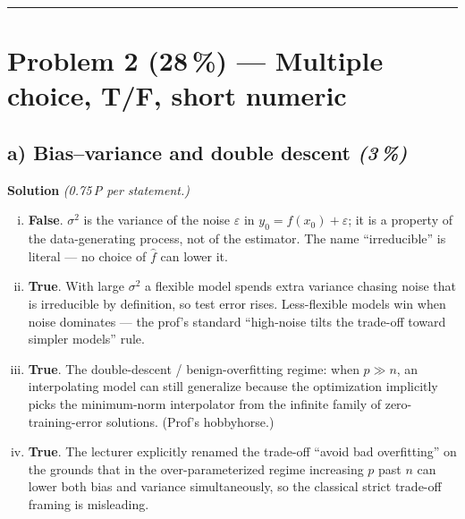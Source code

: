 \documentclass[11pt,a4paper]{article}
\newcommand{\points}[1]{\textbf{(#1\,\%)}}
\newcommand{\subpoints}[1]{\textit{(#1\,\%)}}
\newcommand{\sol}{\noindent\textbf{Solution}}
\begin{document}
\vspace{0.6em}
\hrule
\vspace{1em}

\section*{Problem 2 \points{28} --- Multiple choice, T/F, short numeric}

\subsection*{a) Bias--variance and double descent \subpoints{3}}
\sol{} \emph{(0.75\,P per statement.)}
\begin{enumerate}[(i)]
  \item \textbf{False}. $\sigma^2$ is the variance of the noise $\varepsilon$ in $y_0 = f(x_0)+\varepsilon$;
        it is a property of the data-generating process, not of the estimator. The name
        ``irreducible'' is literal --- no choice of $\hat f$ can lower it.
  \item \textbf{True}. With large $\sigma^2$ a flexible model spends extra variance chasing noise that
        is irreducible by definition, so test error rises. Less-flexible models win when noise
        dominates --- the prof's standard ``high-noise tilts the trade-off toward simpler models''
        rule.
  \item \textbf{True}. The double-descent / benign-overfitting regime: when $p \gg n$, an
        interpolating model can still generalize because the optimization implicitly picks the
        minimum-norm interpolator from the infinite family of zero-training-error solutions.
        (Prof's hobbyhorse.)
  \item \textbf{True}. The lecturer explicitly renamed the trade-off ``avoid bad overfitting'' on
        the grounds that in the over-parameterized regime increasing $p$ past $n$ can lower both
        bias and variance simultaneously, so the classical strict trade-off framing is misleading.
\end{enumerate}
\end{document}
